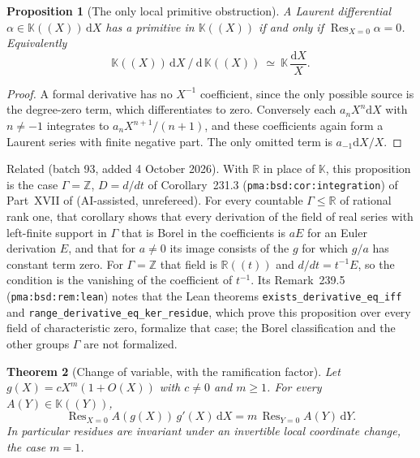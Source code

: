 \documentclass[11pt,a4paper]{article}
\numberwithin{equation}{section}
\newtheorem{theorem}{Theorem}[section]
\newtheorem{proposition}[theorem]{Proposition}
\theoremstyle{definition}
\theoremstyle{remark}
\theoremstyle{plain}
\newcommand{\K}{\mathbb K}
\DeclareMathOperator{\Res}{Res}                 %
\newcommand{\dd}{\mathrm d}
\begin{document}
\begin{proposition}[The only local primitive obstruction]
\label{b:formalprimitive}
A Laurent differential $\alpha\in\K((X))\,\dd X$ has a primitive in
$\K((X))$ if and only if $\Res_{X=0}\alpha=0$. Equivalently
\[
 \K((X))\,\dd X\ /\ \dd\,\K((X))\ \simeq\ \K\,\frac{\dd X}{X}.
\]
\end{proposition}

\begin{proof}
A formal derivative has no $X^{-1}$ coefficient, since the only possible
source is the degree-zero term, which differentiates to zero. Conversely
each $a_nX^{n}\dd X$ with $n\ne-1$ integrates to $a_nX^{n+1}/(n+1)$, and
these coefficients again form a Laurent series with finite negative part.
The only omitted term is $a_{-1}\dd X/X$.
\end{proof}

Related (batch 93, added 4 October 2026).  With $\mathbb R$ in place of $\K$,
this proposition is the case $\Gamma=\mathbb Z$, $D=d/dt$ of Corollary~231.3
(\texttt{pma:bsd:cor:integration}) of Part~XVII of
(AI-assisted, unrefereed).  For every countable $\Gamma\le\mathbb R$ of
rational rank one, that corollary shows that every derivation of the field of
real series with left-finite support in $\Gamma$ that is Borel in the
coefficients is $aE$ for an Euler derivation $E$, and that for $a\ne0$ its
image consists of the $g$ for which $g/a$ has constant term zero.  For
$\Gamma=\mathbb Z$ that field is $\mathbb R((t))$ and $d/dt=t^{-1}E$, so the
condition is the vanishing of the coefficient of $t^{-1}$.  Its Remark~239.5
(\texttt{pma:bsd:rem:lean}) notes that the Lean theorems
\texttt{exists\_derivative\_eq\_iff} and
\texttt{range\_derivative\_eq\_ker\_residue}, which prove this proposition
over every field of characteristic zero, formalize that case; the Borel
classification and the other groups $\Gamma$ are not formalized.

\begin{theorem}[Change of variable, with the ramification factor]
\label{b:reschange}
Let $g(X)=cX^{m}(1+O(X))$ with $c\ne0$ and $m\ge1$. For every
$A(Y)\in\K((Y))$,
\begin{equation}
\label{b:eq-reschange}
 \Res_{X=0}A(g(X))\,g'(X)\,\dd X=m\,\Res_{Y=0}A(Y)\,\dd Y .
\end{equation}
In particular residues are invariant under an invertible local coordinate
change, the case $m=1$.
\end{theorem}
\end{document}
